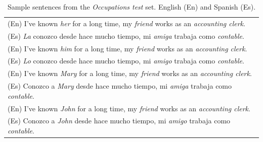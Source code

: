 \documentclass[11pt,a4paper]{article}
\begin{document}
\begin{table}[h!]
\centering
\begin{tabular}{l}%
\hline
(En) I've known \textit{her} for a long time, my \textit{friend} works as an \textit{accounting clerk}. \\
(Es) \textit{La} conozco desde hace mucho tiempo, mi \textit{amiga} trabaja como \textit{contable}. \\
\hline
(En) I've known \textit{him} for a long time, my \textit{friend} works as an \textit{accounting clerk}. \\
(Es) \textit{Lo} conozco desde hace mucho tiempo, mi \textit{amigo} trabaja como \textit{contable}. \\
\hline
(En) I've known \textit{Mary} for a long time, my \textit{friend} works as an \textit{accounting clerk}. \\
(Es) Conozco a \textit{Mary} desde hace mucho tiempo, mi \textit{amiga} trabaja como \textit{contable}. \\
\hline
(En) I've known \textit{John} for a long time, my \textit{friend} works as an \textit{accounting clerk}. \\
(Es) Conozco a \textit{John} desde hace mucho tiempo, mi \textit{amigo} trabaja como \textit{contable}. \\
\hline
\end{tabular}
\caption{\label{tab:samples-occ} Sample sentences from the \textit{Occupations test} set. English (En) and Spanish (Es).}
\end{table}



\end{document}
